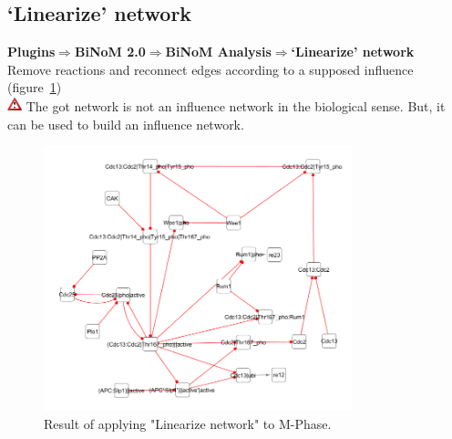\subsection{‘Linearize’ network}
\textbf{Plugins$\Rightarrow$BiNoM 2.0$\Rightarrow$BiNoM Analysis$\Rightarrow$‘Linearize’ network}\\
Remove reactions and reconnect edges according to a supposed influence (figure~\ref{Linearized_Network_M-Phase})\\
\includegraphics[width=12pt,height=12pt]{graphics/warning} The got network is not an influence network in the biological sense. But, it can be used to build an influence network.
\begin{figure}
\centering
\includegraphics[width=0.8\textwidth]{graphics/Linearized_Network_M-Phase}
\caption{Result of applying "Linearize network" to M-Phase.}
\label{Linearized_Network_M-Phase}
\end{figure}

